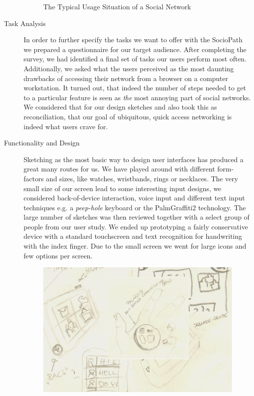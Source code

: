 \begin{description}
\begin{figure}[h]
\begin{center}
  \end{center}
  \caption{The Typical Usage Situation of a Social Network}
  \label{fig:context}
\end{figure}
  \item[Task Analysis]
    In order to further specify the tasks we want to offer with the SocioPath
    we prepared a questionnaire for our target audience. After completing the 
    survey, we had identified a final set of tasks our users perform most often. 
    Additionally, we asked what the users perceived as the most daunting drawbacks
    of accessing their network from a browser on a computer workstation. It turned 
    out, that indeed the number of steps needed to get to a particular feature
    is seen as \emph{the} most annoying part of social networks. We considered 
    that for our design sketches and also took this as reconciliation, that our 
    goal of ubiquitous, quick access networking is indeed what users crave for.
  \item[Functionality and Design]
    Sketching as the most basic way to design user interfaces has produced 
    a great many routes for us. We have played around with different form-factors 
    and sizes, like watches, wristbands, rings or necklaces. The very small 
    size of our screen lead to some interesting input designs, we considered
    back-of-device interaction, voice input and different text input techniques
    e.g. a \emph{peep-hole} keyboard or the Palm\registered Graffiti2\trademark
    technology. The large number of sketches was then reviewed together with a 
    select group of people from our user study. We ended up prototyping a fairly 
    conservative device with a standard touchscreen and text recognition for 
    handwriting with the index finger. Due to the small screen we went for large 
    icons and few options per screen.
\begin{figure}[h]
  \begin{center}
    \includegraphics[width=1.0\linewidth]{imgs/sketches.png}

\end{center}
\end{figure}
\end{description}
